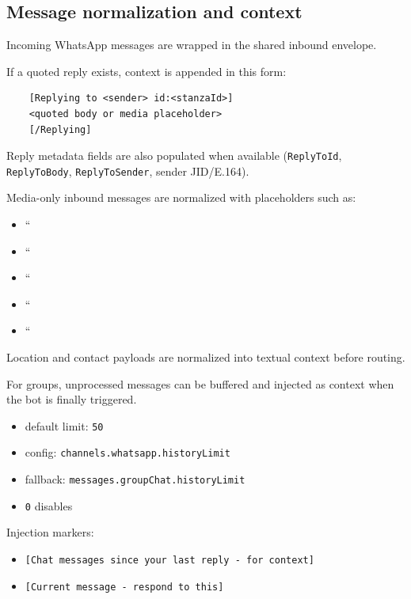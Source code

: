 \subsection{Message normalization and context}


Incoming WhatsApp messages are wrapped in the shared inbound envelope.

If a quoted reply exists, context is appended in this form:

\begin{lstlisting}
    [Replying to <sender> id:<stanzaId>]
    <quoted body or media placeholder>
    [/Replying]
\end{lstlisting}


Reply metadata fields are also populated when available (\texttt{ReplyToId}, \texttt{ReplyToBody}, \texttt{ReplyToSender}, sender JID/E.164).


Media-only inbound messages are normalized with placeholders such as:

\begin{itemize}
  \item ``
  \item ``
  \item ``
  \item ``
  \item ``
\end{itemize}


Location and contact payloads are normalized into textual context before routing.


For groups, unprocessed messages can be buffered and injected as context when the bot is finally triggered.

\begin{itemize}
  \item default limit: \texttt{50}
  \item config: \texttt{channels.whatsapp.historyLimit}
  \item fallback: \texttt{messages.groupChat.historyLimit}
  \item \texttt{0} disables
\end{itemize}


Injection markers:

\begin{itemize}
  \item \texttt{[Chat messages since your last reply - for context]}
  \item \texttt{[Current message - respond to this]}
\end{itemize}



